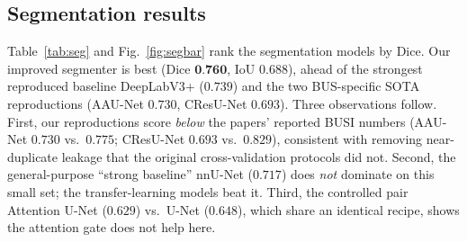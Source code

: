 \documentclass[11pt]{article}
\newcommand{\best}[1]{\textbf{#1}}
\begin{document}
\subsection{Segmentation results}
\label{sec:results-seg}
Table~\ref{tab:seg} and Fig.~\ref{fig:segbar} rank the segmentation models by Dice.
Our improved segmenter is best (Dice $\best{0.760}$, IoU $0.688$), ahead of the
strongest reproduced baseline DeepLabV3+ ($0.739$) and the two BUS-specific SOTA
reproductions (AAU-Net $0.730$, CResU-Net $0.693$). Three observations follow.
First, our reproductions score \emph{below} the papers' reported BUSI numbers
(AAU-Net $0.730$ vs.\ $0.775$; CResU-Net $0.693$ vs.\ $0.829$), consistent with
removing near-duplicate leakage that the original cross-validation protocols did
not. Second, the general-purpose ``strong baseline'' nnU-Net ($0.717$) does
\emph{not} dominate on this small set; the transfer-learning models beat it. Third,
the controlled pair Attention U-Net ($0.629$) vs.\ U-Net ($0.648$), which share an
identical recipe, shows the attention gate does not help here.
\end{document}
